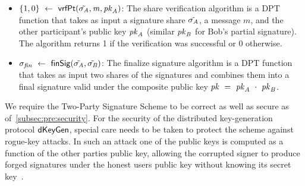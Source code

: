 \begin{definition}
\begin{itemize}
        \item $\{1,0\} ~\leftarrow~ \mathsf{vrfPt}(\tilde{\sigma_{\mathit{A}}}, \mathit{m}, \mathit{pk}_{\mathit{A}})$: The share verification algorithm is a DPT function that takes as input a signature share $\tilde{\sigma_{\mathit{A}}}$, a message $m$, and the other participant's public key $\mathit{pk}_{\mathit{A}}$ (similar $\mathit{pk}_{\mathit{B}}$ for Bob's partial signature).
        The algorithm returns 1 if the verification was successful or 0 otherwise.

        \item $\sigma_{\mathit{fin}} ~\leftarrow~ \mathsf{finSig}(\tilde{\sigma_{\mathit{A}}}, \tilde{\sigma_{\mathit{B}}})$: The finalize signature algorithm is a DPT function that takes as input two shares of the signatures and combines them into a final signature valid under the composite public key $\mathit{pk} ~=~ \mathit{pk}_{\mathit{A}} ~\cdot~ \mathit{pk}_{\mathit{B}}$.

    \end{itemize}

\end{definition}

We require the Two-Party Signature Scheme to be correct as well as secure as of~\cref{subsec:pre:security}.
For the security of the distributed key-generation protocol $\mathsf{dKeyGen}$, special care needs to be taken to protect the scheme against rogue-key attacks.
In such an attack one of the public keys is computed as a function of the other parties public key, allowing the corrupted signer to produce forged signatures under the honest users public key without knowing its secret key~\cite{maxwell2019simple}.


